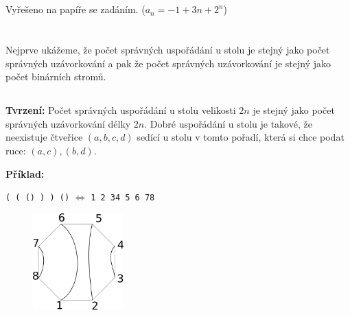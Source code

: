\documentclass[a4paper]{article}
\newcommand{\n}{\newline}
\begin{document}
\vspace{-4cm}
{\fontsize{12}{15}\selectfont \hspace{-0.5cm}}


\section{}
Vyřešeno na papíře se zadáním. ($ a_n = -1 + 3n + 2^n$)

\section{}
Nejprve ukážeme, že počet správných uspořádání u stolu je stejný jako počet správných uzávorkování a pak že počet správných uzávorkování je stejný jako počet binárních stromů.

\subsection{}
\textbf{Tvrzení:} Počet správných uspořádání u stolu velikosti $2n$ je stejný jako počet správných uzávorkování délky $2n$. Dobré uspořádání u stolu je takové, že neexistuje čtveřice $(a, b, c, d)$ sedící u stolu v tomto pořadí, která si chce podat ruce: $(a, c), (b, d)$.
\vspace{0.4cm}

\textbf{Příklad:} \n \vspace{0.5cm} \n

\text{}\hspace{2.6cm}\texttt{( ( () ) ) ()}  \hspace{1.6cm} $\Leftrightarrow$  \n
\text{}\hspace{2.6cm}\texttt{1 2 34 5 6 78} \n
\vspace{-3.3cm}
\begin{figure}[h]
	\centering \hspace{4cm}
	 \includegraphics[width=3.5cm]{seating}
\end{figure}
\end{document}
